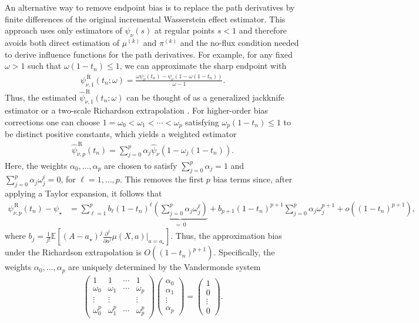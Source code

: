 \documentclass[11pt,twoside]{article}
\theoremstyle{definition}
\theoremstyle{remark}
\begin{document}
An alternative way to remove endpoint bias is to replace the path derivatives by finite differences of the original incremental Wasserstein effect estimator. This approach uses only estimators of $\psi_\nu(s)$ at regular points $s<1$ and therefore avoids both direct estimation of $\mu^{(k)}$ and $\pi^{(k)}$ and the no-flux condition needed to derive influence functions for the path derivatives. For example, for any fixed $ \omega >1$ such that $\omega(1-t_n)\leq1$, we can approximate the sharp endpoint with
\begin{align*}
\psi_{\nu,1}^{\, \mathrm{R}}(t_n;\omega) = \frac{ \omega\psi_\nu(t_n) - \psi_\nu(1-\omega(1-t_n))
}{\omega - 1}.
\end{align*}
Thus, the estimated $\widehat{\psi}_{\nu,1}^{\, \mathrm{R}}(t_n;\omega)$ can be thought of as a generalized jackknife estimator \citep{Cattaneo2013_jackknife} or a two-scale Richardson extrapolation \citep{richardson27, bach2021}. For higher-order bias corrections one can choose $1=\omega_0<\omega_1<\cdots<\omega_p$ satisfying $\omega_p (1-t_n)\leq1$ to be distinct positive constants, which yields a weighted estimator
\begin{align*}
\widehat\psi_{\nu,p}^{\,\mathrm{R}}(t_n) = \sum_{j=0}^p \alpha_j\widehat\psi_\nu(1-\omega_j(1-t_n)).
\end{align*}
Here, the weights $\alpha_0,\ldots,\alpha_p$ are chosen to satisfy $\sum_{j=0}^p \alpha_j=1$ and $\sum_{j=0}^p \alpha_j \omega_j^\ell=0$, for $\ell=1,\ldots,p$. This removes the first $p$ bias terms since, after applying a Taylor expansion, it follows that
\begin{align*}
    \psi_{\nu,p}^{\,\mathrm R}(t_n)-\psi_\star &= \sum_{\ell=1}^{p} b_\ell (1-t_n)^\ell \underbrace{\left(\sum_{j=0}^{p}\alpha_j\omega_j^\ell \right)}_{= \, 0} + b_{p+1}(1-t_n)^{p+1} \sum_{j=0}^{p}\alpha_j\omega_j^{p+1} +o((1-t_n)^{p+1}),
\end{align*}
where $b_j =  \frac{1}{j!} \mathbb{E}[(A-a_\star)^j  \frac{\partial^j}{\partial a^j}\mu(X,a)|_{a=a_\star}]$. Thus, the approximation bias under the Richardson extrapolation is $O((1-t_n)^{p+1})$. Specifically, the weights $\alpha_0, \ldots, \alpha_p$ are uniquely determined by the Vandermonde system
\begin{align} \label{vandermonde}
    \begin{pmatrix}
        1 & 1 & \cdots & 1 \\
        \omega_0 & \omega_1 & \cdots & \omega_p \\
        \vdots & \vdots & & \vdots \\
        \omega_0^p & \omega_1^p & \cdots & \omega_p^p
    \end{pmatrix}
    \begin{pmatrix}
        \alpha_0\\ \alpha_1\\ \vdots\\ \alpha_p
    \end{pmatrix}
    =
    \begin{pmatrix}
        1\\0\\ \vdots\\0
    \end{pmatrix}.
\end{align}
\end{document}
